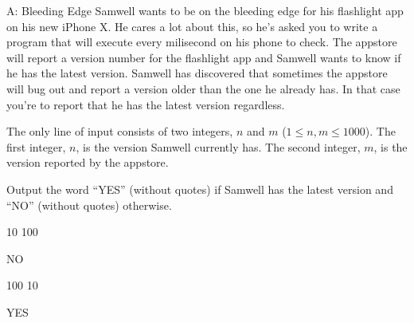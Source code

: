 \begin{problem}{A: Bleeding Edge}
Samwell wants to be on the bleeding edge for his flashlight app on his new iPhone X.
He cares a lot about this, so he's asked you to write a program that will execute every milisecond on his phone to check.
The appstore will report a version number for the flashlight app and Samwell wants to know if he has the latest version.
Samwell has discovered that sometimes the appstore will bug out and report a version older than the one he already has.
In that case you're to report that he has the latest version regardless.
\end{problem}

\begin{formalin}
The only line of input consists of two integers, $n$ and $m$ ($1 \leq n, m \leq 1000$).
The first integer, $n$, is the version Samwell currently has.
The second integer, $m$, is the version reported by the appstore.
\end{formalin}

\begin{formalout}
Output the word ``YES'' (without quotes) if Samwell has the latest version and ``NO'' (without quotes) otherwise.
\end{formalout}

\begin{datain}
10 100
\end{datain}
\begin{dataout}
NO
\end{dataout}

\begin{datain}
100 10
\end{datain}
\begin{dataout}
YES
\end{dataout}
